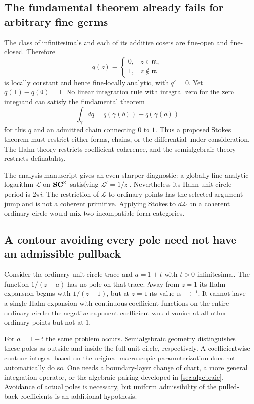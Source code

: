 \documentclass[11pt,letterpaper]{article}
\theoremstyle{definition}
\theoremstyle{remark}
\newcommand{\m}{\mathfrak m}\newcommand{\st}{\operatorname{st}}
\numberwithin{equation}{section}
\begin{document}
\subsection{The fundamental theorem already fails for arbitrary fine germs}
The class of infinitesimals and each of its additive cosets are fine-open and fine-closed. Therefore
\[
 q(z)=\begin{cases}0,&z\in\m,\\1,&z\notin\m\end{cases}
\]
is locally constant and hence fine-locally analytic, with $q'=0$. Yet $q(1)-q(0)=1$. No linear integration rule with integral zero for the zero integrand can satisfy the fundamental theorem
\[
 \int_\gamma dq=q(\gamma(b))-q(\gamma(a))
\]
for this $q$ and an admitted chain connecting $0$ to $1$. Thus a proposed Stokes theorem must restrict either forms, chains, or the differential under consideration. The Hahn theory restricts coefficient coherence, and the semialgebraic theory restricts definability.

The analysis manuscript gives an even sharper diagnostic: a globally fine-analytic logarithm $\mathcal L$ on $\mathbf{SC}^\times$ satisfying $\mathcal L'=1/z$ \cite[section ``A global fine-analytic logarithm'']{Analysis}. Nevertheless its Hahn unit-circle period is $2\pi i$. The restriction of $\mathcal L$ to ordinary points has the selected argument jump and is not a coherent primitive. Applying Stokes to $d\mathcal L$ on a coherent ordinary circle would mix two incompatible form categories.

\subsection{A contour avoiding every pole need not have an admissible pullback}
Consider the ordinary unit-circle trace and $a=1+t$ with $t>0$ infinitesimal. The function $1/(z-a)$ has no pole on that trace. Away from $z=1$ its Hahn expansion begins with $1/(z-1)$, but at $z=1$ its value is $-t^{-1}$. It cannot have a single Hahn expansion with continuous coefficient functions on the entire ordinary circle: the negative-exponent coefficient would vanish at all other ordinary points but not at $1$.

For $a=1-t$ the same problem occurs. Semialgebraic geometry distinguishes these poles as outside and inside the full unit circle, respectively. A coefficientwise contour integral based on the original macroscopic parameterization does not automatically do so. One needs a boundary-layer change of chart, a more general integration operator, or the algebraic pairing developed in \cref{sec:algebraic}. Avoidance of actual poles is necessary, but uniform admissibility of the pulled-back coefficients is an additional hypothesis.
\end{document}
